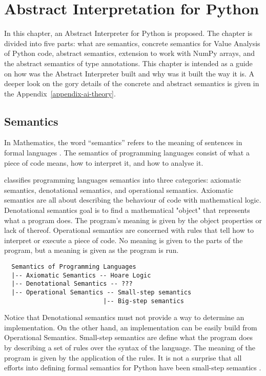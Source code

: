 \chapter{Abstract Interpretation for Python}\label{ai-for-python}

In this chapter, an Abstract Interpreter for Python is proposed. The chapter is divided
into five parts: what are semantics, concrete semantics for Value Analysis of Python code,
abstract semantics, extension to work with NumPy arrays, and the abstract semantics of
type annotations. This chapter is intended as a guide on how was the Abstract Interpreter
built and why was it built the way it is. A deeper look on the gory details of the
concrete and abstract semantics is given in the Appendix~\ref{appendix-ai-theory}.

\section{Semantics}

In Mathematics, the word \enquote{semantics} refers to the meaning of sentences in formal
languages \autocite{gunter_semantics_1992}. The semantics of programming languages
consist of what a piece of code means, how to interpret it, and how to analyse it.

\textcite{mitchell1996foundations}%
classifies programming
languages semantics into three categories: axiomatic semantics, denotational semantics,
and operational semantics. Axiomatic semantics are all about describing the behaviour of
code with mathematical logic. Denotational semantics goal is to find a mathematical
"object" that represents what a program does. The program's meaning is given by the
object properties or lack of thereof. Operational semantics are concerned with rules that
tell how to interpret or execute a piece of code. No meaning is given to the parts of the
program, but a meaning is given as the program is run.


\begin{verbatim}
  Semantics of Programming Languages
  |-- Axiomatic Semantics -- Hoare Logic
  |-- Denotational Semantics -- ???
  |-- Operational Semantics -- Small-step semantics
                           |-- Big-step semantics
\end{verbatim}

Notice that Denotational semantics must not provide a way to determine an implementation.
On the other hand, an implementation can be easily build from Operational Semantics.
Small-step semantics are define what the program does by describing a set of rules over
the syntax of the language. The meaning of the program is given by the application of the
rules. It is not a surprise that all efforts into defining formal semantics for Python
have been small-step semantics
\autocites{ranson_semantics_2008}{guth_formal_2013}{politz_python_2013}{fromherz_static_2018}.


